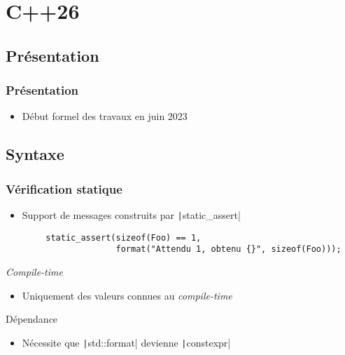 \documentclass[C++.tex]{subfiles}
\begin{document}
\section{C++26}
\subsection*{Présentation}
\begin{frame}
	\frametitle{Présentation}
	\begin{itemize}
		\item Début formel des travaux en juin 2023
	\end{itemize}
\end{frame}

\subsection*{Syntaxe}
\begin{frame}[fragile]
	\frametitle{Vérification statique}
	\begin{itemize}
		\item Support de messages construits par \texttt|static_assert|
	\end{itemize}

	\begin{verbatim}
		static_assert(sizeof(Foo) == 1,
		              format("Attendu 1, obtenu {}", sizeof(Foo)));
	\end{verbatim}

	\begin{alertblock}{\textit{Compile-time}}
		\begin{itemize}
			\item Uniquement des valeurs connues au \textit{compile-time}
		\end{itemize}
	\end{alertblock}

	\begin{alertblock}{Dépendance}
		\begin{itemize}
			\item Nécessite que \texttt|std::format| devienne \texttt|constexpr|
		\end{itemize}
	\end{alertblock}

\end{frame}
\end{document}
